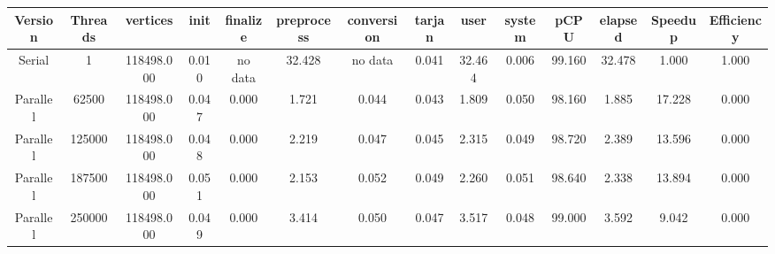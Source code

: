 \begin{tabular}{|c|c|c|c|c|c|c|c|c|c|c|c|c|c|}
\toprule
 Version &  Threads &   vertices &  init & finalize &  preprocess & conversion &  tarjan &   user &  system &   pCPU &  elapsed &  Speedup &  Efficiency \\
\midrule
  Serial &        1 & 118498.000 & 0.010 &  no data &      32.428 &    no data &   0.041 & 32.464 &   0.006 & 99.160 &   32.478 &    1.000 &       1.000 \\
Parallel &    62500 & 118498.000 & 0.047 &    0.000 &       1.721 &      0.044 &   0.043 &  1.809 &   0.050 & 98.160 &    1.885 &   17.228 &       0.000 \\
Parallel &   125000 & 118498.000 & 0.048 &    0.000 &       2.219 &      0.047 &   0.045 &  2.315 &   0.049 & 98.720 &    2.389 &   13.596 &       0.000 \\
Parallel &   187500 & 118498.000 & 0.051 &    0.000 &       2.153 &      0.052 &   0.049 &  2.260 &   0.051 & 98.640 &    2.338 &   13.894 &       0.000 \\
Parallel &   250000 & 118498.000 & 0.049 &    0.000 &       3.414 &      0.050 &   0.047 &  3.517 &   0.048 & 99.000 &    3.592 &    9.042 &       0.000 \\
\bottomrule
\end{tabular}
